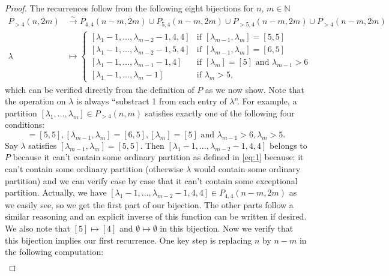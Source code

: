 \documentclass[12pt, a4paper]{article}
\theoremstyle{remark}
\begin{document}
\begin{proof}
  The recurrences follow from the following eight bijections for $n$, $m \in \mathbb{N}$
  \begin{align*}
    P_{>4}(n, 2m) &\xrightarrow{\sim} P_{4, 4}(n - m, 2m) \cup P_{5, 4}(n - m, 2m) \cup P_{>5, 4}(n - m, 2m) \cup P_{>4}(n - m, 2m) \\
    \lambda &\mapsto
              \begin{cases}
                [\lambda_1 - 1, \dots, \lambda_{m - 2} - 1, 4, 4] &\text{if }[\lambda_{m - 1}, \lambda_m] = [5, 5] \\
                [\lambda_1 - 1, \dots, \lambda_{m - 2} - 1, 5, 4] &\text{if }[\lambda_{m - 1}, \lambda_m] = [6, 5] \\
                [\lambda_1 - 1, \dots, \lambda_{m - 1} - 1, 4] &\text{if }[\lambda_m] = [5]\text{ and }\lambda_{m - 1} > 6 \\
                [\lambda_1 - 1, \dots, \lambda_m - 1] &\text{if }\lambda_m > 5,
              \end{cases}
  \end{align*}
  which can be verified directly from the definition of $P$ as we now show.
  Note that the operation on $\lambda$ is always ``substract 1 from each entry of $\lambda$''.
  For example, a partition $[\lambda_1, \dots, \lambda_m] \in P_{>4}(n, m)$ satisfies exactly one of the following four conditions:
  \begin{equation*}
    [\lambda_{m - 1}, \lambda_m] = [5, 5], [\lambda_{m - 1}, \lambda_m] = [6, 5], [\lambda_m] = [5]\text{ and }\lambda_{m - 1} > 6, \lambda_m > 5.
  \end{equation*}
  Say $\lambda$ satisfies $[\lambda_{m - 1}, \lambda_m] = [5, 5]$.
  Then $[\lambda_1 - 1, \dots, \lambda_{m - 2} - 1, 4, 4]$ belongs to $P$ because it can't contain some ordinary partition as defined in \eqref{eq:1} because: it can't contain some ordinary partition (otherwise $\lambda$ would contain some ordinary partition) and we can verify case by case that it can't contain some exceptional partition.
  Actually, we have $[\lambda_1 - 1, \dots, \lambda_{m - 2} - 1, 4, 4] \in P_{4, 4}(n - m, 2m)$ as we easily see, so we get the first part of our bijection.
  The other parts follow a similar reasoning and an explicit inverse of this function can be written if desired.
  We also note that $[5] \mapsto [4]$ and $\emptyset \mapsto \emptyset$ in this bijection.
  Now we verify that this bijection implies our first recurrence.
  One key step is replacing $n$ by $n - m$ in the following computation:
  \begin{align*}

\end{align*}
\end{proof}
\end{document}
